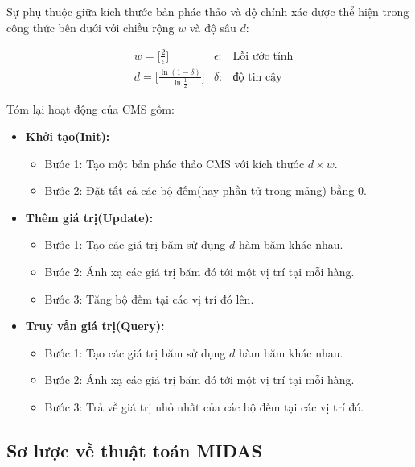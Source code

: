 Sự phụ thuộc giữa kích thước bản phác thảo và độ chính xác\cite{cms_error} được thể hiện trong công thức bên dưới
với chiều rộng $w$ và độ sâu $d$:

\begin{align*}
     & w = \Big[\frac{2}{\epsilon}\Big]                         & \epsilon: & \text{Lỗi ước tính} \\
     & d = \Big[\frac{\ln{(1 - \delta)}}{\ln{\frac{1}{2}}}\Big] & \delta:   & \text{độ tin cậy}
\end{align*}

Tóm lại hoạt động của CMS gồm:
\begin{itemize}
    \item \textbf{Khởi tạo(Init):}
          \begin{itemize}
              \item{Bước 1:} Tạo một bản phác thảo CMS với kích thước $d \times w$.
              \item{Bước 2:} Đặt tất cả các bộ đếm(hay phần tử trong mảng) bằng 0.
          \end{itemize}
    \item \textbf{Thêm giá trị(Update):}
          \begin{itemize}
              \item{Bước 1:} Tạo các giá trị băm sử dụng $d$ hàm băm khác nhau.
              \item{Bước 2:} Ánh xạ các giá trị băm đó tới một vị trí tại mỗi hàng.
              \item{Bước 3:} Tăng bộ đếm tại các vị trí đó lên.
          \end{itemize}

    \item \textbf{Truy vấn giá trị(Query):}
          \begin{itemize}
              \item{Bước 1:} Tạo các giá trị băm sử dụng $d$ hàm băm khác nhau.
              \item{Bước 2:} Ánh xạ các giá trị băm đó tới một vị trí tại mỗi hàng.
              \item{Bước 3:} Trả về giá trị nhỏ nhất của các bộ đếm tại các vị trí đó.
          \end{itemize}
\end{itemize}

\subsection{Sơ lược về thuật toán MIDAS}


